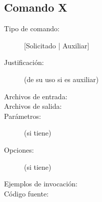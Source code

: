 \documentclass[12pt]{article}
\begin{document}
\subsection{Comando X}
\begin{description}
	\item [Tipo de comando:] [Solicitado | Auxiliar]
	
	\item [Justificación:] (de su uso si es auxiliar)
	
	\item [Archivos de entrada:]
	
	\item [Archivos de salida:]
	
	\item [Parámetros:] (si tiene)
	
	\item [Opciones:] (si tiene)
	
	\item [Ejemplos de invocación:]
	
	\item [Código fuente:]
\end{description}
{\footnotesize
%
}
\end{document}

